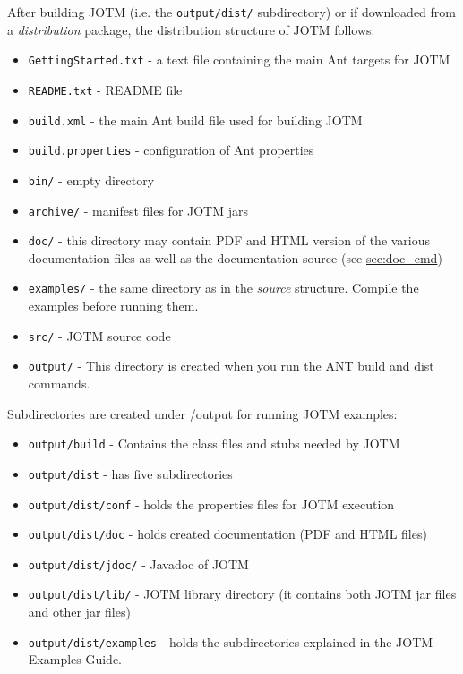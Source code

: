 \documentclass[a4paper,11pt]{article}
\begin{document}
After building JOTM (i.e. the \texttt{output/dist/}
subdirectory) or if downloaded from a \emph{distribution} package,
the distribution structure of JOTM follows:
\begin{itemize}
\item \texttt{GettingStarted.txt} - a text file containing the main Ant targets
  for JOTM
\item \texttt{README.txt} - README file
\item \texttt{build.xml} - the main Ant build file used for building JOTM
\item \texttt{build.properties} - configuration of Ant properties
\item \texttt{bin/} - empty directory
\item \texttt{archive/} - manifest files for JOTM jars 
\item \texttt{doc/} - this directory may contain PDF and HTML version of the
  various documentation files as well as the documentation source 
(see \hyperref{Generate Documentation}{section}{}{sec:doc_cmd})
\item \texttt{examples/} - the same directory as in the \emph{source}
  structure. Compile the examples before running them.
\item \texttt{src/} - JOTM source code
\item \texttt{output/} - This directory is created when you run the ANT 
build and dist commands.
\end{itemize}
Subdirectories are created under /output for running JOTM examples:
\begin{itemize}
\item \texttt{output/build} - Contains the class files and 
stubs needed by JOTM
\item \texttt{output/dist} - has five subdirectories
\item \texttt{output/dist/conf} - holds the properties 
files for JOTM execution
\item \texttt{output/dist/doc} - holds created documentation 
(PDF and HTML files)
\item \texttt{output/dist/jdoc/} - Javadoc of JOTM
\item \texttt{output/dist/lib/} - JOTM library directory (it contains both 
JOTM jar files and other jar files)
\item \texttt{output/dist/examples} - holds the subdirectories 
explained in the JOTM Examples Guide.

\end{itemize}
\end{document}
